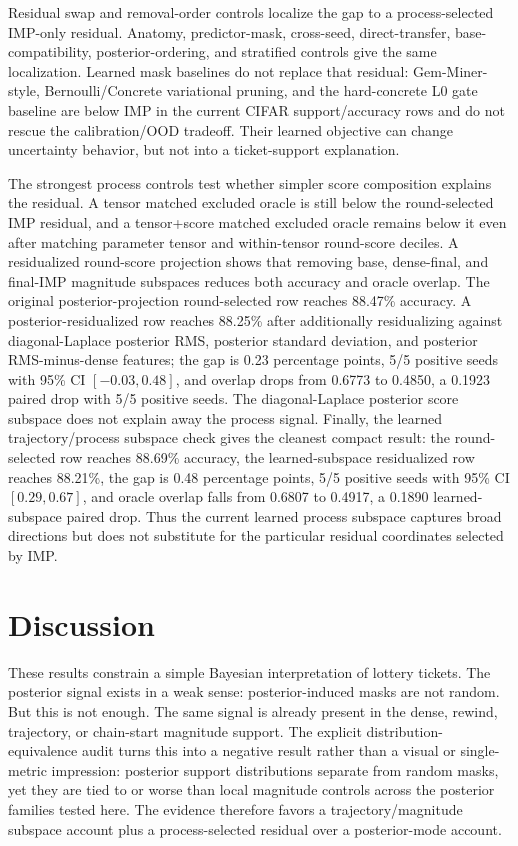 \documentclass{article}
\begin{document}
Residual swap and removal-order controls localize the gap to a
process-selected IMP-only residual. Anatomy, predictor-mask, cross-seed,
direct-transfer, base-compatibility, posterior-ordering, and stratified
controls give the same localization. Learned mask baselines do not replace that
residual: Gem-Miner-style, Bernoulli/Concrete variational pruning, and the
hard-concrete L0 gate baseline are below IMP in the current CIFAR
support/accuracy rows and do not rescue the calibration/OOD tradeoff. Their
learned objective can change uncertainty behavior, but not into a
ticket-support explanation.

The strongest process controls test whether simpler score composition explains
the residual. A tensor matched excluded oracle is still below the round-selected
IMP residual, and a tensor+score matched excluded oracle remains below it even
after matching parameter tensor and within-tensor round-score deciles. A
residualized round-score projection shows that removing base, dense-final, and
final-IMP magnitude subspaces reduces both accuracy and oracle overlap. The
original posterior-projection round-selected row reaches 88.47\% accuracy. A
posterior-residualized row reaches 88.25\% after additionally residualizing
against diagonal-Laplace posterior RMS, posterior standard deviation, and
posterior RMS-minus-dense features; the gap is 0.23 percentage points, 5/5
positive seeds with 95\% CI $[-0.03,0.48]$, and overlap drops from 0.6773 to
0.4850, a 0.1923 paired drop with 5/5 positive seeds. The diagonal-Laplace
posterior score subspace does not explain away the process signal. Finally, the learned
trajectory/process subspace check gives the cleanest compact result: the
round-selected row reaches 88.69\% accuracy, the learned-subspace residualized
row reaches 88.21\%, the gap is 0.48 percentage points, 5/5 positive seeds with
95\% CI $[0.29,0.67]$, and oracle overlap falls from 0.6807 to 0.4917, a
0.1890 learned-subspace paired drop. Thus the current learned process subspace
captures broad directions but does not substitute for the particular residual
coordinates selected by IMP.

\section{Discussion}

These results constrain a simple Bayesian interpretation of lottery tickets.
The posterior signal exists in a weak sense: posterior-induced masks are not
random. But this is not enough. The same signal is already present in the dense,
rewind, trajectory, or chain-start magnitude support. The explicit
distribution-equivalence audit turns this into a negative result rather than a
visual or single-metric impression: posterior support distributions separate
from random masks, yet they are tied to or worse than local magnitude controls
across the posterior families tested here. The evidence therefore favors a
trajectory/magnitude subspace account plus a process-selected residual over a
posterior-mode account.
\end{document}
